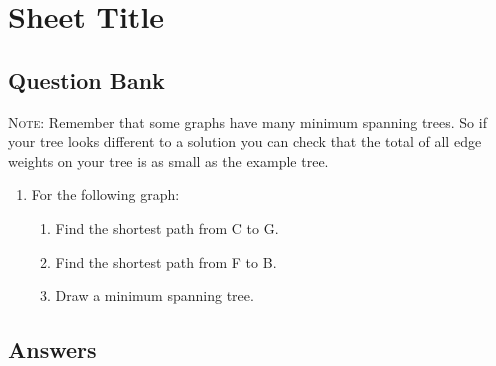 \documentclass[a4paper,12pt]{article}
\begin{document}
\large
\section*{Sheet Title}

\subsection*{Question Bank}

\textsc{Note}: Remember that some graphs have many minimum spanning 
trees. So if your tree looks different to a solution you can check 
that the total of all edge weights on your tree is as small as 
the example tree. 

\begin{enumerate}
\item For the following graph:

    \begin{enumerate}
    \item Find the shortest path from C to G.
    \item Find the shortest path from F to B.
    \item Draw a minimum spanning tree.
    \end{enumerate}

\end{enumerate}

\newpage
\subsection*{Answers}
\end{document}
